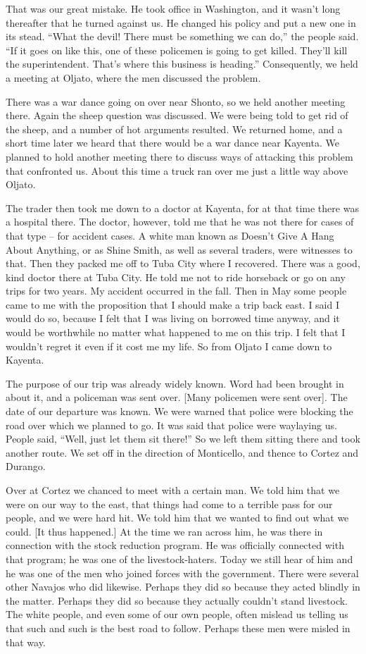That was our great mistake. He took office in Washington, and it wasn't long thereafter that he turned against us. He changed his policy and put a new one in its stead. ``What the devil! There must be something we can do,'' the people said. ``If it goes on like this, one of these policemen is going to get killed. They'll kill the superintendent. That's where this business is heading.'' Consequently, we held a meeting at Oljato, where the men discussed the problem.

There was a war dance going on over near Shonto, so we held another meeting there. Again the sheep question was discussed. We were being told to get rid of the sheep, and a number of hot arguments resulted. We returned home, and a short time later we heard that there would be a war dance near Kayenta. We planned to hold another meeting there to discuss ways of attacking this problem that confronted us. About this time a truck ran over me just a little way above Oljato.

The trader then took me down to a doctor at Kayenta, for at that time there was a hospital there. The doctor, however, told me that he was not there for cases of that type -- for accident cases. A white man known as Doesn't Give A Hang About Anything, or as Shine Smith, as well as several traders, were witnesses to that. Then they packed me off to Tuba City where I recovered. There was a good, kind doctor there at Tuba City. He told me not to ride horseback or go on any trips for two years. My accident occurred in the fall. Then in May some people came to me with the proposition that I should make a trip back east. I said I would do so, because I felt that I was living on borrowed time anyway, and it would be worthwhile no matter what happened to me on this trip. I felt that I wouldn't regret it even if it cost me my life. So from Oljato I came down to Kayenta.

The purpose of our trip was already widely known. Word had been brought in about it, and a policeman was sent over. [Many policemen were sent over]. The date of our departure was known. We were warned that police were blocking the road over which we planned to go. It was said that police were waylaying us. People said, ``Well, just let them sit there!'' So we left them sitting there and took another route. We set off in the direction of Monticello, and thence to Cortez and Durango.

Over at Cortez we chanced to meet with a certain man. We told him that we were on our way to the east, that things had come to a terrible pass for our people, and we were hard hit. We told him that we wanted to find out what we could. [It thus happened.] At the time we ran across him, he was there in connection with the stock reduction program. He was officially connected with that program; he was one of the livestock-haters. Today we still hear of him and he was one of the men who joined forces with the government. There were several other Navajos who did likewise. Perhaps they did so because they acted blindly in the matter. Perhaps they did so because they actually couldn't stand livestock. The white people, and even some of our own people, often mislead us telling us that such and such is the best road to follow. Perhaps these men were misled in that way.

